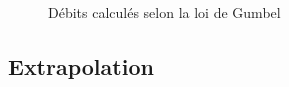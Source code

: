 \begin{figure}[H]
    \centering
    \caption{Débits calculés selon la loi de Gumbel}
    \label{graph:debits_gumbel_tronquee}
\end{figure}

\subsection{Extrapolation}
